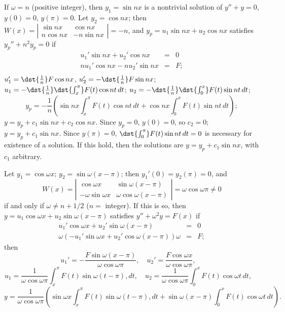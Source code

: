 \documentclass[dvips]{book}
\renewcommand{\exer}[1]{\par\medskip\;\noindent{\color{red}\bf #1.}}
\numberwithin{example}{section}
\numberwithin{equation}{section}
\numberwithin{theorem}{section}
\numberwithin{table}{section}
\numberwithin{figure}{section}
\begin{document}
If $\omega= n$ (positive integer), then $y_{1}=\sin nx$  is a nontrivial
solution of $y''+y=0$, $y(0)=0$, $y(\pi)=0$. Let $y_{2}=\cos nx$; then
$W(x)=
\left|\begin{array}{crccccc}
\sin  nx &\cos nx \\ n\cos nx&-n\sin nx
\end{array}\right|=-n$, and $y_{p}=u_{1}\sin nx+u_{2}\cos nx$
satisfies $y_{p}''+n^{2}y_{p}=0$  if
\begin{eqnarray*}
u_{1}'\sin nx +u_{2}'\cos nx&=&0\\
nu_{1}'\cos nx -nu_{2}'\sin nx&=&F;\\
\end{eqnarray*}
$u_{1}'=\dst{\frac{1}{n}}F\cos nx$,
$u_{2}'=-\dst{\frac{1}{n}}F\sin nx$;
$u_{1}=-\dst{\frac{1}{n}}\dst{\int_{x}^{\pi}}F(t)\cos nt\,dt$;
$u_{2}=-\dst{\frac{1}{n}}\dst{\int_{0}^{x}}F(t)\sin nt\,dt$;
$$
y_{p}=-\frac{1}{n}\left(\sin nx\int_{x}^{\pi}F(t)\cos nt\,dt
+\cos nx \int_{0}^{x}F(t)\sin nt\,dt\right);
$$
$y=y_{p}+c_{1}\sin nx+c_{2}\cos nx$. Since $y_{p}=0$, $y(0)=0$, so
$c_{2}=0$; $y=y_{p}+c_{1}\sin nx$. Since $y(\pi)=0$,
$\dst{\int_{0}^{\pi}}F(t)\sin nt\,dt=0$ is necessary for existence of a
solution. If this hold, then the solutions are $y=y_{p}+c_{1}\sin nx$,
with $c_{1}$ arbitrary.


\exer{13.1.18}
Let $y_{1}=\cos\omega x$; $y_{2}=\sin\omega(x-\pi)$; then
$y_{1}'(0)=y_{2}(\pi)=0$, and
$$
W(x)=
\left|\begin{array}{ccccccc}
\cos\omega x& \sin\omega(x-\pi)\\
-\omega\sin\omega x&\omega\cos\omega(x-\pi)
\end{array}\right|=\omega\cos\omega\pi\ne0
$$
if and only if $\omega\ne n+1/2$ ($n=$ integer).
If this is so, then $y=u_{1}\cos \omega x+u_{2}\sin\omega(x-\pi)$
satisfies $y''+\omega^{2}y=F(x)$ if
\begin{eqnarray*}
u_{1}'\cos\omega x+u_{2}'\sin\omega(x-\pi)&=&0\\
\omega(-u_{1}'\sin\omega x+u_{2}'\cos\omega(x-\pi))\omega&=&F;
\end{eqnarray*}
then
$$
u_{1}'=-\frac{F\sin\omega(x-\pi)}{\omega\cos\omega\pi},\quad
u_{2}'=\frac{F\cos\omega x}{\omega\cos\omega\pi}, \quad
$$
$$
u_{1}=\frac{1}{\omega\cos\omega\pi}
\int_{x}^{\pi}F(t) \sin\omega(t-\pi),dt, \quad
u_{2}=\frac{1}{\omega\cos\omega\pi}
\int_{0}^{x} F(t)\cos\omega t\,dt,\quad
$$
$$
y=\frac{1}{\omega\cos\omega\pi}
\left(\sin\omega x \int_{x}^{\pi}F(t) \sin\omega(t-\pi),dt
+\sin\omega(x-\pi)\int_{0}^{x}F(t)\cos\omega t\,dt\right).
$$
\end{document}
